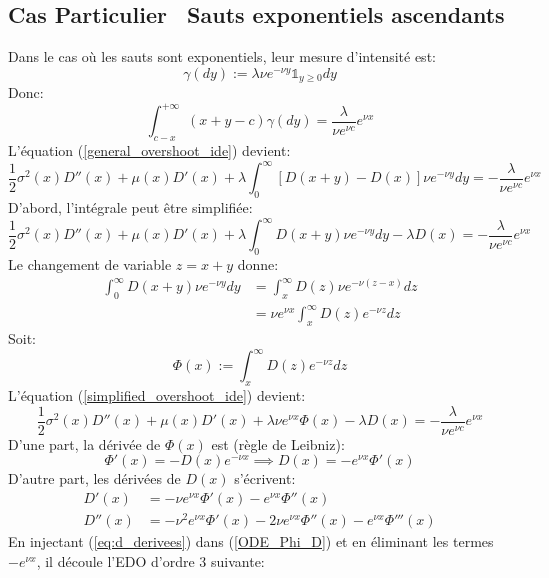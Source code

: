 \subsection{Cas Particulier \textemdash~Sauts exponentiels ascendants}
Dans le cas où les sauts sont exponentiels, leur mesure d'intensité est:
\[
\gamma(dy):=\lambda\nu e^{-\nu y}\mathds{1}_{y\geq0}dy
\]
Donc:
\[
\int_{c-x}^{+\infty}(x+y-c)\gamma(dy)=\frac{\lambda}{\nu e^{\nu c}}e^{\nu x}
\]
L'équation (\ref{general_overshoot_ide}) devient:
\begin{equation}\label{initial_overshoot_ide}
    \frac{1}{2}\sigma^2(x)D''(x)+\mu(x)D'(x)+\lambda\int_0^\infty[D(x+y)-D(x)]\nu e^{-\nu y}dy=-\frac{\lambda}{\nu e^{\nu c}}e^{\nu x}
\end{equation}
D'abord, l'intégrale peut être simplifiée: 
\begin{equation}\label{simplified_overshoot_ide}
    \frac{1}{2}\sigma^2(x)D''(x)+\mu(x)D'(x)+\lambda\int_0^\infty D(x+y)\nu e^{-\nu y}dy-\lambda D(x)=-\frac{\lambda}{\nu e^{\nu c}}e^{\nu x}
\end{equation}
Le changement de variable $z=x+y$ donne:
\[
\begin{aligned}
    \int_0^\infty D(x+y)\nu e^{-\nu y}dy&=\int_x^\infty D(z)\nu e^{-\nu(z-x)}dz\\
    &=\nu e^{\nu x}\int_x^\infty D(z)e^{-\nu z}dz
\end{aligned}
\]
Soit:
\[
\Phi(x):=\int_x^\infty D(z)e^{-\nu z}dz
\]
L'équation (\ref{simplified_overshoot_ide}) devient:
\begin{equation}\label{ODE_Phi_D}
    \frac{1}{2}\sigma^2(x)D''(x)+\mu(x)D'(x)+\lambda\nu e^{\nu x}\Phi(x)-\lambda D(x)=-\frac{\lambda}{\nu e^{\nu c}}e^{\nu x}
\end{equation}
D'une part, la dérivée de $\Phi(x)$ est (règle de Leibniz):
\begin{equation}\label{Leibniz_rule}
    \Phi'(x)=-D(x)e^{-\nu x}\implies D(x)=-e^{\nu x }\Phi'(x)
\end{equation}
D'autre part, les dérivées de $D(x)$ s'écrivent: 
\begin{equation}\label{eq:d_derivees}
    \begin{aligned}
        D'(x) &= -\nu e^{\nu x}\Phi'(x)-e^{\nu x}\Phi''(x) \\
        D''(x)&= -\nu^2e^{\nu x}\Phi'(x)-2\nu e^{\nu x}\Phi''(x)-e^{\nu x}\Phi'''(x)
    \end{aligned}
\end{equation}
En injectant (\ref{eq:d_derivees}) dans (\ref{ODE_Phi_D}) et en éliminant les termes $-e^{\nu x}$, il découle l'\acs{EDO} d'ordre 3 suivante: 
